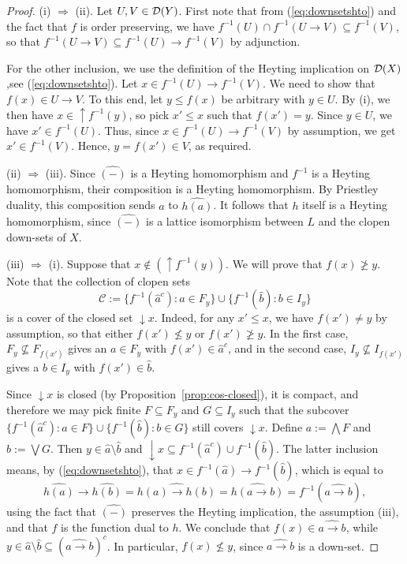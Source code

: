   \begin{proof}
  (i) $\Rightarrow$ (ii). Let $U, V \in \mathcal{D}(Y)$. First note that from (\ref{eq:downsetshto}) and the fact that $f$ is order preserving, we have $f^{-1}(U) \cap f^{-1}(U \to V) \subseteq f^{-1}(V)$, so that $f^{-1}(U \to V) \subseteq f^{-1}(U) \to f^{-1}(V)$ by adjunction.
  
 For the other inclusion, we use the definition of the Heyting implication on $\mathcal{D}(X)$,see (\ref{eq:downsetshto}). Let $x \in f^{-1}(U) \to f^{-1}(V)$. We need to show that $f(x) \in U \to V$. To this end, let $y \leq f(x)$ be arbitrary with $y \in U$. By (i), we then have $x \in {\uparrow} f^{-1}(y)$, so pick $x' \leq x$ such that $f(x') = y$. Since $y \in U$, we have $x' \in f^{-1}(U)$. Thus, since $x \in f^{-1}(U) \to f^{-1}(V)$ by assumption, we get $x' \in f^{-1}(V)$. Hence, $y = f(x') \in V$, as required.
  
  (ii) $\Rightarrow$ (iii). Since $\widehat{(-)}$ is a Heyting homomorphism and
  $f^{-1}$ is a Heyting homomorphism, their composition is a Heyting
  homomorphism. By Priestley duality, this composition sends $a$ to
  $\widehat{h(a)}$. It follows that $h$ itself is a Heyting homomorphism, since
  $\widehat{(-)}$ is a lattice isomorphism between $L$ and the clopen down-sets
  of $X$.
  
  (iii) $\Rightarrow$ (i). Suppose that $x \not\in ({\uparrow} f^{-1}(y))$. We will prove that $f(x) \ngeq y$. Note that the collection of clopen sets 
  $$\mathcal{C} := \{f^{-1}(\widehat{a}^c) \colon a \in F_y\} \cup \{f^{-1}(\widehat{b}) \colon b \in I_y\}$$
  is a cover of the closed set ${\downarrow} x$. Indeed, for any $x' \leq x$, we have $f(x') \neq y$ by assumption, so that either $f(x') \nleq y$ or $f(x') \ngeq y$. In the first case, $F_y \not\subseteq F_{f(x')}$ gives an $a \in F_y$ with $f(x') \in \widehat{a}^c$, and in the second case, $I_{y} \not\subseteq I_{f(x')}$ gives a $b \in I_y$ with $f(x') \in \widehat{b}$. 
  
  Since ${\downarrow} x$ is closed (by Proposition~\ref{prop:cos-closed}), it is compact, and therefore we may pick finite $F \subseteq F_y$ and $G \subseteq I_y$ such that  the subcover $\{f^{-1}(\widehat{a}^c) \colon a \in F\} \cup \{f^{-1}(\widehat{b}) \colon b \in G\}$ still covers ${\downarrow} x$. Define $a := \bigwedge F$ and $b := \bigvee G$. Then $y \in \widehat{a} \setminus \widehat{b}$ and ${\downarrow} x \subseteq f^{-1}(\widehat{a}^c) \cup f^{-1}(\widehat{b})$. The latter inclusion means, by (\ref{eq:downsetshto}), that $x \in f^{-1}(\widehat{a}) \to f^{-1}(\widehat{b})$, which is equal to 
  \[\widehat{h(a)} \to \widehat{h(b)} = \widehat{h(a) \to h(b)} = \widehat{h(a \to b)} = f^{-1}(\widehat{a \to b}),\]
  using the fact that $\widehat{(-)}$ preserves the Heyting implication, the assumption (iii), and that $f$ is the function dual to $h$. We conclude that $f(x) \in \widehat{a \to b}$, while $y \in \widehat{a} \setminus \widehat{b} \subseteq (\widehat{a \to b})^c$. In particular, $f(x) \nleq y$, since $\widehat{a \to b}$ is a down-set.
  \end{proof}
  
